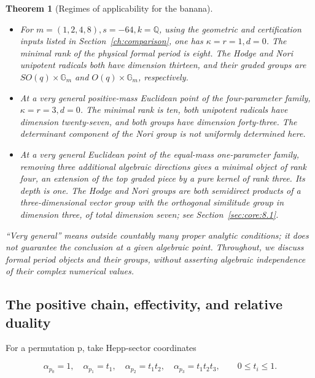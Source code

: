 \documentclass[11pt,a4paper,oneside]{article}
\theoremstyle{plain}
\newtheorem{theorem}{Theorem}[section]
\theoremstyle{definition}
\theoremstyle{remark}
\newcommand{\tightlist}{\setlength{\itemsep}{0pt}\setlength{\parskip}{0pt}}
\numberwithin{equation}{section}
\begin{document}
\begin{theorem}[Regimes of applicability for the banana]

\label{thm:core:C}

\begin{itemize}
\tightlist
\item
  For \(m=(1,2,4,8),s=-64,k=\mathbb Q\), using the geometric and certification inputs listed in Section~\ref{ch:comparison}, one has \(\kappa=r=1,d=0\). The minimal rank of the physical formal period is eight. The Hodge and Nori unipotent radicals both have dimension thirteen, and their graded groups are \(SO(q)\times\mathbb G_m\) and \(O(q)\times\mathbb G_m\), respectively.
\item
  At a very general positive-mass Euclidean point of the four-parameter family, \(\kappa=r=3,d=0\). The minimal rank is ten, both unipotent radicals have dimension twenty-seven, and both groups have dimension forty-three. The determinant component of the Nori group is not uniformly determined here.
\item
  At a very general Euclidean point of the equal-mass one-parameter family, removing three additional algebraic directions gives a minimal object of rank four, an extension of the top graded piece by a pure kernel of rank three. Its depth is one. The Hodge and Nori groups are both semidirect products of a three-dimensional vector group with the orthogonal similitude group in dimension three, of total dimension seven; see Section~\ref{sec:core:8.1}.
\end{itemize}

``Very general'' means outside countably many proper analytic conditions; it does not guarantee the conclusion at a given algebraic point. Throughout, we discuss formal period objects and their groups, without asserting algebraic independence of their complex numerical values.

\end{theorem}


\subsection{The positive chain, effectivity, and relative duality}\label{sec:core:2}

For a permutation p, take Hepp-sector coordinates

\begin{equation}
\alpha_{p_0}=1,\quad\alpha_{p_1}=t_1,\quad
 \alpha_{p_2}=t_1t_2,\quad\alpha_{p_3}=t_1t_2t_3,
 \qquad 0\leq t_i\leq1.
\end{equation}
\end{document}
